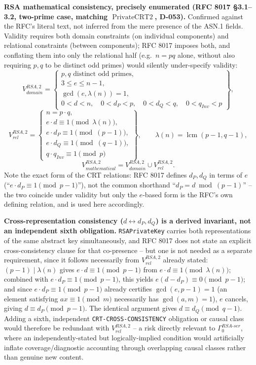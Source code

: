 \documentclass[11pt,a4paper]{article}
\begin{document}
\textbf{RSA mathematical consistency, precisely enumerated (RFC 8017 \S3.1--3.2, two-prime case, matching $\operatorname{PrivateCRT2}$, D-053).} Confirmed against the RFC's literal text, not inferred from the mere presence of the ASN.1 fields. Validity requires both domain constraints (on individual components) and relational constraints (between components); RFC 8017 imposes both, and conflating them into only the relational half (e.g.\ $n=pq$ alone, without also requiring $p,q$ to be distinct odd primes) would silently under-specify validity:
\[
V_{domain}^{RSA,2} = \left\{
\begin{array}{l}
p,q \text{ distinct odd primes}, \\
3 \le e \le n-1, \\
\gcd(e,\lambda(n))=1, \\
0<d<n,\quad 0<d_P<p,\quad 0<d_Q<q,\quad 0<q_{Inv}<p
\end{array}
\right\},
\]
\[
V_{rel}^{RSA,2} = \left\{
\begin{array}{l}
n = p\cdot q, \\
e\cdot d \equiv 1 \pmod{\lambda(n)}, \\
e\cdot d_P \equiv 1 \pmod{(p-1)}, \\
e\cdot d_Q \equiv 1 \pmod{(q-1)}, \\
q\cdot q_{Inv} \equiv 1 \pmod{p}
\end{array}
\right\}, \qquad \lambda(n)=\operatorname{lcm}(p-1,q-1),
\]
\[
V_{mathematical}^{RSA,2} = V_{domain}^{RSA,2} \cup V_{rel}^{RSA,2}.
\]
Note the exact form of the CRT relations: RFC 8017 defines $d_P,d_Q$ in terms of $e$ (``$e\cdot d_P \equiv 1 \pmod{p-1}$''), not the common shorthand ``$d_P = d \bmod (p-1)$'' -- the two coincide under validity but only the $e$-based form is the RFC's own defining relation, and is used here accordingly.

\textbf{Cross-representation consistency ($d \leftrightarrow d_P,d_Q$) is a derived invariant, not an independent sixth obligation.} \texttt{RSAPrivateKey} carries both representations of the same abstract key simultaneously, and RFC 8017 does not state an explicit cross-consistency clause for that co-presence -- but one is not needed as a separate requirement, since it follows necessarily from $V_{rel}^{RSA,2}$ already stated: $(p-1)\mid\lambda(n)$ gives $e\cdot d\equiv 1\pmod{p-1}$ from $e\cdot d\equiv 1\pmod{\lambda(n)}$; combined with $e\cdot d_P\equiv 1\pmod{p-1}$, this yields $e(d-d_P)\equiv 0\pmod{p-1}$; and since $e\cdot d_P\equiv 1\pmod{p-1}$ already certifies $\gcd(e,p-1)=1$ (an element satisfying $ax\equiv1\pmod m$ necessarily has $\gcd(a,m)=1$), $e$ cancels, giving $d\equiv d_P\pmod{p-1}$. The identical argument gives $d\equiv d_Q\pmod{q-1}$. Adding a sixth, independent \texttt{CRT-CROSS-CONSISTENCY} obligation or causal class would therefore be redundant with $V_{rel}^{RSA,2}$ -- a risk directly relevant to $\Gamma_0^{RSA\text{-}ser}$, where an independently-stated but logically-implied condition would artificially inflate coverage/diagnostic accounting through overlapping causal classes rather than genuine new content.
\end{document}
